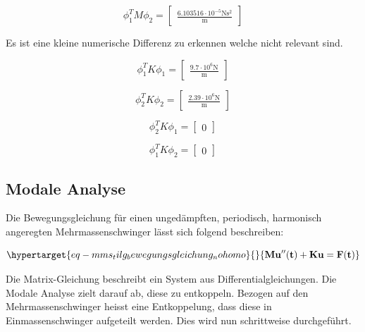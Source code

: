 \documentclass[
  letterpaper,
  DIV=11]{scrreprt}
\begin{document}
\begin{equation}\phi_{1}^{T} M \phi_{2} = \left[\begin{matrix}\frac{6.103516 \cdot 10^{-5} \text{N} \text{s}^{2}}{\text{m}}\end{matrix}\right]\end{equation}

Es ist eine kleine numerische Differenz zu erkennen welche nicht
relevant sind.

\begin{equation}\phi_{1}^{T} K \phi_{1} = \left[\begin{matrix}\frac{9.7 \cdot 10^{6} \text{N}}{\text{m}}\end{matrix}\right]\end{equation}

\begin{equation}\phi_{2}^{T} K \phi_{2} = \left[\begin{matrix}\frac{2.39 \cdot 10^{6} \text{N}}{\text{m}}\end{matrix}\right]\end{equation}

\begin{equation}\phi_{2}^{T} K \phi_{1} = \left[\begin{matrix}0\end{matrix}\right]\end{equation}

\begin{equation}\phi_{1}^{T} K \phi_{2} = \left[\begin{matrix}0\end{matrix}\right]\end{equation}

\hypertarget{modale-analyse}{%
\subsection{Modale Analyse}\label{modale-analyse}}

Die Bewegungsgleichung für einen ungedämpften, periodisch, harmonisch
angeregten Mehrmassenschwinger lässt sich folgend beschreiben:

\begin{equation}\protect\hypertarget{eq-mms_tilg_bewegungsgleichung_nohomo}{}{
\mathbf{M u''(t) + K u = F(t)}
}\label{eq-mms_tilg_bewegungsgleichung_nohomo}\end{equation}

Die Matrix-Gleichung beschreibt ein System aus Differentialgleichungen.
Die Modale Analyse zielt darauf ab, diese zu entkoppeln. Bezogen auf den
Mehrmassenschwinger heisst eine Entkoppelung, dass diese in
Einmassenschwinger aufgeteilt werden. Dies wird nun schrittweise
durchgeführt.
\end{document}
